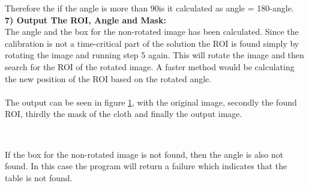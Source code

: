 Therefore the if the angle is more than 90\degree is it calculated as angle = 180\degree-angle.\\

\textbf{7) Output The ROI, Angle and Mask:}\\
The angle and the box for the non-rotated image has been calculated. Since the calibration is not a time-critical part of the solution the ROI is found simply by rotating the image and running step 5 again.  This will rotate the image and then search for the ROI of the rotated image. A faster method would be calculating the new position of the ROI based on the rotated angle.
\\\\
The output can be seen in figure \ref{fig:tablelocateoutput}, with the original image, secondly the found ROI, thirdly the mask of the cloth and finally the output image.

\begin{figure}[H]
\centering
{}
\\
\label{fig:tablelocateoutput}
\end{figure}

If the box for the non-rotated image is not found, then the angle is also not found. In this case the program will return a failure which indicates that the table is not found.